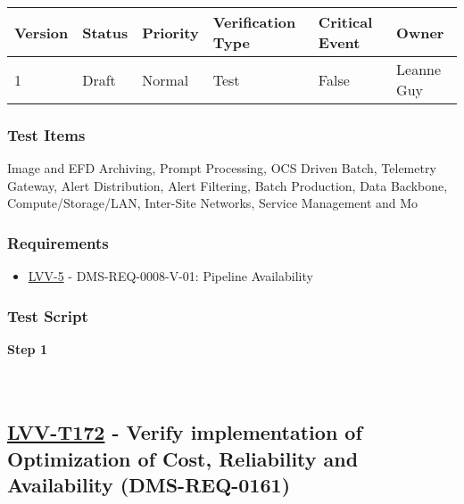 \begin{longtable}[]{@{}llllll@{}}
\toprule
Version & Status & Priority & Verification Type & Critical Event &
Owner\tabularnewline
\midrule
\endhead
1 & Draft & Normal & Test & False & Leanne Guy\tabularnewline
\bottomrule
\end{longtable}

\hypertarget{test-items-147}{%
\subsubsection{Test Items}\label{test-items-147}}

Image and EFD Archiving, Prompt Processing, OCS Driven Batch, Telemetry
Gateway, Alert Distribution, Alert Filtering, Batch Production, Data
Backbone, Compute/Storage/LAN, Inter-Site Networks, Service Management
and Mo

\hypertarget{requirements-148}{%
\subsubsection{Requirements}\label{requirements-148}}

\begin{itemize}
\tightlist
\item
  \href{https://jira.lsstcorp.org/browse/LVV-5}{LVV-5} -
  DMS-REQ-0008-V-01: Pipeline Availability
\end{itemize}

\hypertarget{test-script-148}{%
\subsubsection{Test Script}\label{test-script-148}}

\textbf{Step 1}\\
~\\
~\\

\hypertarget{lvv-t172---verify-implementation-of-optimization-of-cost-reliability-and-availability-dms-req-0161}{%
\subsection{\texorpdfstring{\href{https://jira.lsstcorp.org/secure/Tests.jspa\#/testCase/LVV-T172}{LVV-T172}
- Verify implementation of Optimization of Cost, Reliability and
Availability
(DMS-REQ-0161)}{LVV-T172 - Verify implementation of Optimization of Cost, Reliability and Availability (DMS-REQ-0161)}}\label{lvv-t172---verify-implementation-of-optimization-of-cost-reliability-and-availability-dms-req-0161}}

